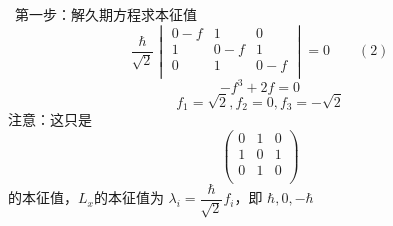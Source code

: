 \begin{frame} 
    \解~第一步：解久期方程求本征值
    $$\frac{\hbar}{\sqrt{2}}
    \begin{vmatrix}
       0-f & 1 & 0  \\
       1 & 0-f & 1  \\
       0 & 1 & 0-f \\
    \end{vmatrix} 
    =0 \qquad (2) $$
   $$ -f^3+2f=0 $$
   $$ f_1=\sqrt{2}, f_2=0, f_3=-\sqrt{2} $$
   注意：这只是
   $$\begin{pmatrix}
       0 & 1 & 0  \\
       1 & 0 & 1  \\
       0 & 1 & 0 \\
    \end{pmatrix} $$
    的本征值，$L_x$的本征值为 $\lambda_i=\dfrac{\hbar}{\sqrt{2}} f_i$，即 $ \hbar, 0, -\hbar$
\end{frame}

